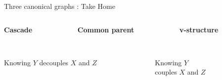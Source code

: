 \documentclass[10pt]{beamer}
\begin{document}
\begin{frame}{Three canonical graphs : Take Home}


\begin{columns}[onlytextwidth,t]
 \begin{column}{0.33\textwidth}
  \centering
    \textbf{Cascade} \\[.3cm]
		   \\[.3cm]
    \end{column}
    
 \begin{column}{0.33\textwidth}
  \centering
    \textbf{Common parent} \\[.3cm]
		  \\[.3cm] 
    \end{column}
    
 \begin{column}{0.33\textwidth}
  \centering
    \textbf{v-structure} \\[.3cm]
		   \\[.3cm]
    \end{column}
    
\end{columns}

\vfill
\begin{columns}
 \begin{column}{0.67\textwidth}
 \centering
 Knowing $Y$ \alert{decouples} $X$ and $Z$
    \end{column}
  
   \begin{column}{0.33\textwidth}
   \centering
 Knowing $Y$ \\  \alert{couples} $X$ and $Z$
    \end{column}
    
 \end{columns}
 
 \end{frame}
 
 
 
\end{document}

